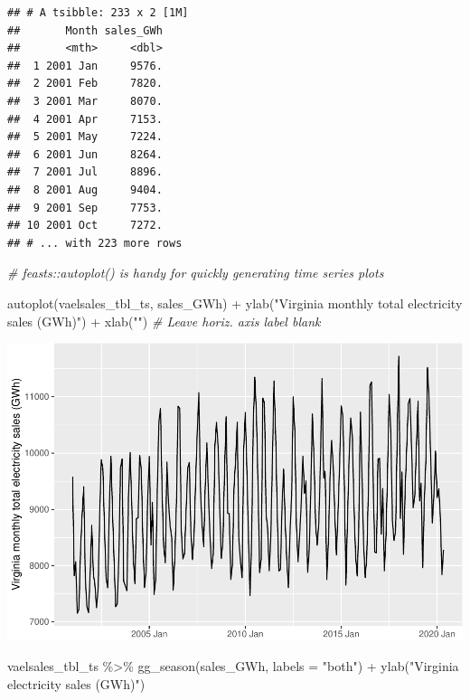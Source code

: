 \documentclass[
]{book}
\newenvironment{Shaded}{\begin{snugshade}}{\end{snugshade}}
\newcommand{\AttributeTok}[1]{\textcolor[rgb]{0.77,0.63,0.00}{#1}}
\newcommand{\CommentTok}[1]{\textcolor[rgb]{0.56,0.35,0.01}{\textit{#1}}}
\newcommand{\FunctionTok}[1]{\textcolor[rgb]{0.00,0.00,0.00}{#1}}
\newcommand{\NormalTok}[1]{#1}
\newcommand{\SpecialCharTok}[1]{\textcolor[rgb]{0.00,0.00,0.00}{#1}}
\newcommand{\StringTok}[1]{\textcolor[rgb]{0.31,0.60,0.02}{#1}}
\begin{document}
\begin{verbatim}
## # A tsibble: 233 x 2 [1M]
##       Month sales_GWh
##       <mth>     <dbl>
##  1 2001 Jan     9576.
##  2 2001 Feb     7820.
##  3 2001 Mar     8070.
##  4 2001 Apr     7153.
##  5 2001 May     7224.
##  6 2001 Jun     8264.
##  7 2001 Jul     8896.
##  8 2001 Aug     9404.
##  9 2001 Sep     7753.
## 10 2001 Oct     7272.
## # ... with 223 more rows
\end{verbatim}

\begin{Shaded}
\begin{Highlighting}[]
\CommentTok{\# feasts::autoplot() is handy for quickly generating time series plots}

\FunctionTok{autoplot}\NormalTok{(vaelsales\_tbl\_ts, sales\_GWh) }\SpecialCharTok{+}
  \FunctionTok{ylab}\NormalTok{(}\StringTok{"Virginia monthly total electricity sales (GWh)"}\NormalTok{) }\SpecialCharTok{+}
  \FunctionTok{xlab}\NormalTok{(}\StringTok{""}\NormalTok{)  }\CommentTok{\# Leave horiz. axis label blank}
\end{Highlighting}
\end{Shaded}

\includegraphics{graphics/use feasts autoplot-1.pdf}

\begin{Shaded}
\begin{Highlighting}[]
\NormalTok{vaelsales\_tbl\_ts }\SpecialCharTok{\%\textgreater{}\%} \FunctionTok{gg\_season}\NormalTok{(sales\_GWh, }\AttributeTok{labels =} \StringTok{"both"}\NormalTok{) }\SpecialCharTok{+} \FunctionTok{ylab}\NormalTok{(}\StringTok{"Virginia electricity sales (GWh)"}\NormalTok{)}
\end{Highlighting}
\end{Shaded}
\end{document}
